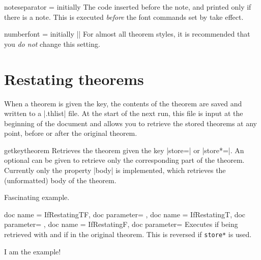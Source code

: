 \documentclass{ltxdoc}
\begin{document}
\begin{docKey}{noteseparator}
  {=}
  {initially \textvisiblespace}
The code inserted before the note, and printed only if there is a note. This is executed \emph{before} the font commands set by  take effect.
\end{docKey}

\begin{docKey}{numberfont}
  {=}
  {initially |\upshape|}
For almost all theorem styles, it is recommended that you \emph{do not} change this setting.
\end{docKey}

\section{Restating theorems}

When a theorem is given the  key, the contents of the theorem are saved and written to a |.thlist| file.
At the start of the next run, this file is input at the beginning of the document and allows you to retrieve the stored theorems at any point, before or after the original theorem.

\begin{docCommand}{getkeytheorem}
  {}
Retrieves the theorem given the key |store=| or |store*=|.
An optional  can be given to retrieve only the corresponding part of the theorem.
Currently only the property |body| is implemented, which retrieves the (unformatted) body of the theorem.

\begin{keythmscode}[]

\begin{example}[store=mytag]
Fascinating example.
\end{example}

\end{keythmscode}

\end{docCommand}

\begin{docCommands}
  {
    {
      doc name = IfRestatingTF,
      doc parameter=
    },
    {
      doc name = IfRestatingT,
      doc parameter=
    },
    {
      doc name = IfRestatingF,
      doc parameter=
    }
  }
Executes  if being retrieved with  and  if in the original theorem. This is reversed if \texttt{store*} is used.

\begin{keythmscode}[]
\begin{example}[store=hmm]
I am the
example!
\end{example}

\end{keythmscode}

\end{docCommands}
\end{document}
